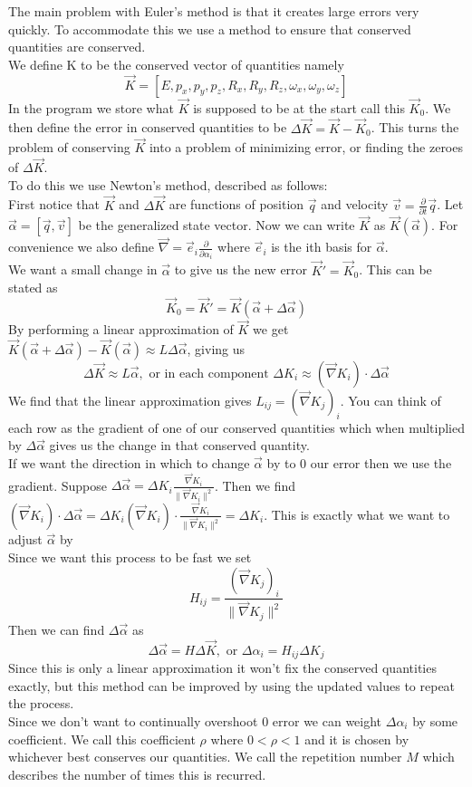 The main problem with Euler's method is that it creates large errors very quickly. To accommodate this we use a method to ensure that conserved quantities are conserved.\\
We define K to be the conserved vector of quantities namely
\[\vec{K}=\left[E, p_x, p_y, p_z, R_x, R_y, R_z, \omega_x, \omega_y, \omega_z\right]\]
In the program we store what $\vec{K}$ is supposed to be at the start call this $\vec{K}_0$. We then define the error in conserved quantities to be $\Delta \vec{K} = \vec{K} - \vec{K}_0$. This turns the problem of conserving $\vec{K}$ into a problem of minimizing error, or finding the zeroes of $\Delta\vec{K}$.\\
To do this we use Newton's method, described as follows:\\
First notice that $\vec{K}$ and $\Delta\vec{K}$ are functions of position $\vec{q}$ and velocity $\vec{v} = \frac{\partial}{\partial t}\vec{q}$. Let $\vec{\alpha} = [\vec{q}, \vec{v}]$ be the generalized state vector. Now we can write $\vec{K}$ as $\vec{K}(\vec{\alpha})$. For convenience we also define $\vec{\nabla} = \vec{e}_i\frac{\partial}{\partial \alpha_i}$ where $\vec{e}_i$ is the ith basis for $\vec{\alpha}$.\\
We want a small change in $\vec{\alpha}$ to give us the new error $\vec{K}'=\vec{K}_0$. This can be stated as
\[\vec{K}_0 = \vec{K}' = \vec{K}(\vec{\alpha}+\Delta\vec{\alpha})\]
By performing a linear approximation of $\vec{K}$ we get $\vec{K}(\vec{\alpha}+\Delta\vec{\alpha}) - \vec{K}(\vec{\alpha})\approx L\Delta\vec{\alpha}$, giving us
\[\Delta \vec{K} \approx L\vec{\alpha},\text{ or in each component }\Delta K_i \approx (\vec{\nabla} K_i)\cdot\Delta\vec{\alpha}\]
We find that the linear approximation gives $L_{ij} = (\vec{\nabla} K_j)_i$. You can think of each row as the gradient of one of our conserved quantities which when multiplied by $\Delta\vec{\alpha}$ gives us the change in that conserved quantity.\\
If we want the direction in which to change $\vec{\alpha}$ by to 0 our error then we use the gradient. Suppose $\Delta\vec{\alpha} = \Delta K_i \frac{\vec{\nabla} K_i}{\|\vec{\nabla} K_i\|^2}$. Then we find $(\vec{\nabla} K_i)\cdot\Delta\vec{\alpha} = \Delta K_i(\vec{\nabla} K_i)\cdot \frac{\vec{\nabla} K_i}{\|\vec{\nabla} K_i\|^2} = \Delta K_i$. This is exactly what we want to adjust $\vec{\alpha}$ by\\
Since we want this process to be fast we set\[H_{ij} = \frac{(\vec{\nabla} K_j)_i}{\|\vec{\nabla} K_j\|^2}\]
Then we can find $\Delta\vec{\alpha}$ as \[\Delta\vec{\alpha} = H\Delta \vec{K},\text{ or } \Delta\alpha_i = H_{ij}\Delta K_j\]
Since this is only a linear approximation it won't fix the conserved quantities exactly, but this method can be improved by using the updated values to repeat the process.\\
Since we don't want to continually overshoot $0$ error we can weight $\Delta\alpha_i$ by some coefficient. We call this coefficient $\rho$ where $0<\rho<1$ and it is chosen by whichever best conserves our quantities. We call the repetition number $M$ which describes the number of times this is recurred.


